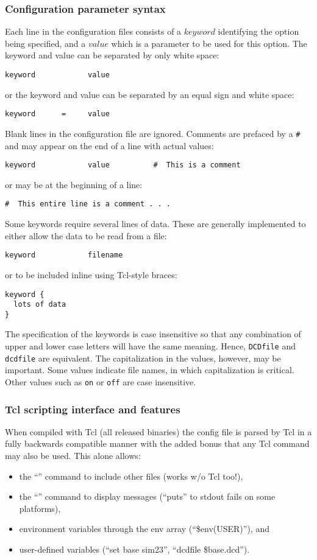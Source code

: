\subsubsection{Configuration parameter syntax}
\label{section:configsyntax}
Each line
in the configuration files consists of a $keyword$ identifying the option
being specified, and a $value$ which is a parameter to be used for this
option.  The keyword and value can be separated by only white space:
\begin{verbatim}
keyword            value
\end{verbatim}
or the keyword and value can be separated by an equal sign and white space:
\begin{verbatim}
keyword      =     value
\end{verbatim}
Blank lines in the configuration file are ignored.  Comments are prefaced by
a \verb!#! and may appear on the end of a line with actual values:
\begin{verbatim}
keyword            value          #  This is a comment
\end{verbatim}
or may be at the beginning of a line:
\begin{verbatim}
#  This entire line is a comment . . . 
\end{verbatim}
Some keywords require several lines of data.
These are generally implemented to either allow the data to be read from a file:
\begin{verbatim}
keyword            filename
\end{verbatim}
or to be included inline using Tcl-style braces:
\begin{verbatim}
keyword {
  lots of data
}
\end{verbatim}

The specification of the keywords is case insensitive 
so that any combination of 
upper and lower case letters will have the same meaning.  
Hence, {\tt DCDfile} and {\tt dcdfile} 
are equivalent.  The capitalization in the values, however, may be important.
Some values indicate file names, in which capitalization is critical.  
Other values such as {\tt on} or {\tt off} are case insensitive.

\subsubsection{Tcl scripting interface and features}
\label{section:tclscripting}

When compiled with Tcl (all released binaries) the config file
is parsed by Tcl in a fully backwards compatible manner with the
added bonus that any Tcl command may also be used.  This alone allows:
\begin{itemize}
 \item the ``'' command to include other files (works w/o Tcl too!),
 \item the ``'' command to display messages (``puts'' to stdout fails on some platforms),
 \item environment variables through the env array (``\$env(USER)''), and
 \item user-defined variables (``set base sim23'', ``dcdfile \${base}.dcd'').
\end{itemize}

